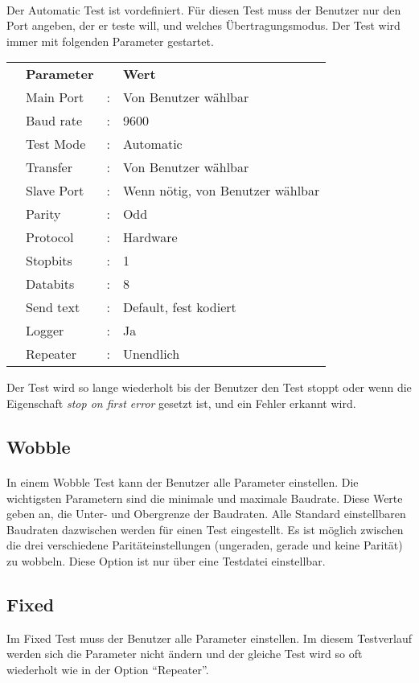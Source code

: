 \paragraph{}
Der Automatic Test ist vordefiniert. Für diesen Test muss der Benutzer nur den Port angeben, der er teste will, und welches Übertragungsmodus. Der Test wird immer mit folgenden Parameter gestartet.
\\
\begin{tabular}{llll}
\\ &\textbf{Parameter} & &\textbf{Wert}
\\ &Main Port &: &Von Benutzer wählbar
\\ &Baud rate &: &9600
\\ &Test Mode &: &Automatic
\\ &Transfer &: &Von Benutzer wählbar
\\ &Slave Port &: &Wenn nötig, von Benutzer wählbar
\\ &Parity &: &Odd
\\ &Protocol &: &Hardware
\\ &Stopbits &: &1
\\ &Databits &: &8
\\ &Send text &: &Default, fest kodiert
\\ &Logger &: &Ja
\\ &Repeater &: &Unendlich
\end{tabular}

Der Test wird so lange wiederholt bis der Benutzer den Test stoppt oder wenn die Eigenschaft \textit{stop on first error} gesetzt ist, und ein Fehler erkannt wird.



\subsection{Wobble}
\paragraph{}
In einem Wobble Test kann der Benutzer alle Parameter einstellen. Die wichtigsten Parametern sind die minimale und maximale Baudrate. Diese Werte geben an, die Unter- und Obergrenze der Baudraten. Alle Standard einstellbaren Baudraten dazwischen werden für einen Test eingestellt. Es ist möglich zwischen die drei verschiedene Paritäteinstellungen (ungeraden, gerade und keine Parität) zu wobbeln. Diese Option ist nur über eine Testdatei einstellbar.


\subsection{Fixed}
Im Fixed Test muss der Benutzer alle Parameter einstellen. Im diesem Testverlauf werden sich die Parameter nicht ändern und der gleiche Test wird so oft wiederholt wie in der Option "`Repeater"'.
